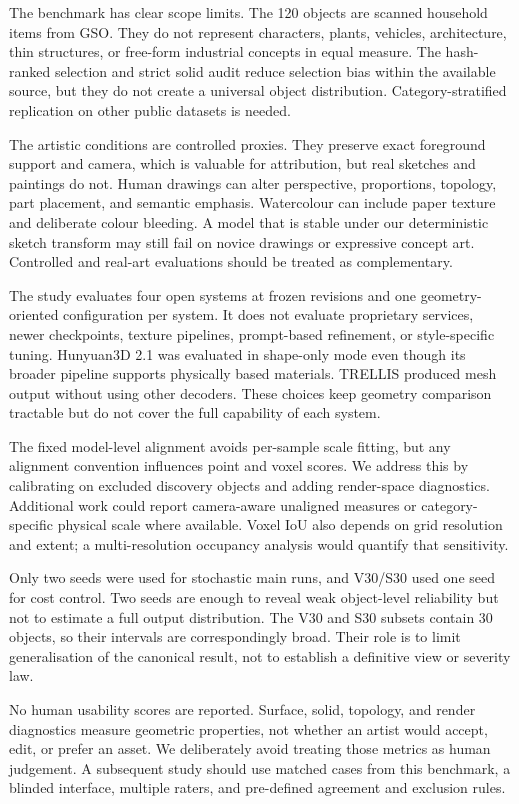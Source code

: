 \documentclass[12pt,a4paper]{article}
\begin{document}
The benchmark has clear scope limits. The 120 objects are scanned household items from GSO. They do not represent characters, plants, vehicles, architecture, thin structures, or free-form industrial concepts in equal measure. The hash-ranked selection and strict solid audit reduce selection bias within the available source, but they do not create a universal object distribution. Category-stratified replication on other public datasets is needed.

The artistic conditions are controlled proxies. They preserve exact foreground support and camera, which is valuable for attribution, but real sketches and paintings do not. Human drawings can alter perspective, proportions, topology, part placement, and semantic emphasis. Watercolour can include paper texture and deliberate colour bleeding. A model that is stable under our deterministic sketch transform may still fail on novice drawings or expressive concept art. Controlled and real-art evaluations should be treated as complementary.

The study evaluates four open systems at frozen revisions and one geometry-oriented configuration per system. It does not evaluate proprietary services, newer checkpoints, texture pipelines, prompt-based refinement, or style-specific tuning. Hunyuan3D 2.1 was evaluated in shape-only mode even though its broader pipeline supports physically based materials. TRELLIS produced mesh output without using other decoders. These choices keep geometry comparison tractable but do not cover the full capability of each system.

The fixed model-level alignment avoids per-sample scale fitting, but any alignment convention influences point and voxel scores. We address this by calibrating on excluded discovery objects and adding render-space diagnostics. Additional work could report camera-aware unaligned measures or category-specific physical scale where available. Voxel IoU also depends on grid resolution and extent; a multi-resolution occupancy analysis would quantify that sensitivity.

Only two seeds were used for stochastic main runs, and V30/S30 used one seed for cost control. Two seeds are enough to reveal weak object-level reliability but not to estimate a full output distribution. The V30 and S30 subsets contain 30 objects, so their intervals are correspondingly broad. Their role is to limit generalisation of the canonical result, not to establish a definitive view or severity law.

No human usability scores are reported. Surface, solid, topology, and render diagnostics measure geometric properties, not whether an artist would accept, edit, or prefer an asset. We deliberately avoid treating those metrics as human judgement. A subsequent study should use matched cases from this benchmark, a blinded interface, multiple raters, and pre-defined agreement and exclusion rules.
\end{document}
